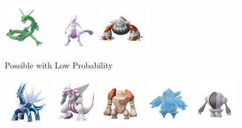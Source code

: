 \documentclass[12pt]{beamer}
\begin{document}
\begin{frame}
\begin{block}{}
\begin{footnotesize}
\begin{center}
 \includegraphics[width=2cm]{../../images/pokemon/rayquaza.png}\quad\quad
 \includegraphics[width=2cm]{../../images/pokemon/mewtwo.png}\quad\quad
 \includegraphics[width=2cm]{../../images/pokemon/heatran.png}
 
 
\bigskip\bigskip
 
Possible with Low Probability

 \includegraphics[width=2cm]{../../images/pokemon/dialga.png}\quad\quad
 \includegraphics[width=2cm]{../../images/pokemon/palkia.png}\quad\quad
 \includegraphics[width=2cm]{../../images/pokemon/regirock.png}\quad\quad
 \includegraphics[width=2cm]{../../images/pokemon/regice.png}\quad\quad
 \includegraphics[width=2cm]{../../images/pokemon/registeel.png}


\end{center}
\end{footnotesize}
\end{block}
\end{frame}
\end{document}
